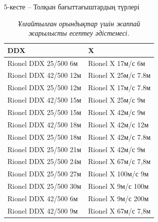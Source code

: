 \begin{table}[H]
\caption*{5-кесте -- Толқын бағыттағыштардың түрлері}
\centering
\begin{tabular}{|l|l|}
\hline
DDX & X \\ \hline
Rionel DDX 25/500 6м & Rionel X 17м/с 6м \\ \hline
Rionel DDX 42/500 12м & Rionel X 25м/с 7.8м \\ \hline
Rionel DDX 25/500 12м & Rionel X 17м/с 7.8м \\ \hline
Rionel DDX 42/500 15м & Rionel X 25м/с 9м \\ \hline
Rionel DDX 25/500 15м & Rionel X 42м/с 9м \\ \hline
Rionel DDX 42/500 18м & Rionel X 42м/с 12м \\ \hline
Rionel DDX 25/500 18м & Rionel X 42м/с 7.8м \\ \hline
Rionel DDX 25/500 21м & Rionel X 42м/с 9м \\ \hline
Rionel DDX 25/500 24м & Rionel X 67м/с 7,8м \\ \hline
Rionel DDX 25/500 27м & Rionel X 100м/с 9м \\ \hline
Rionel DDX 25/500 30м & Rionel X 9м/с 100м \\ \hline
Rionel DDX 42/500 6м & Rionel X 9м/с 200м \\ \hline
Rionel DDX 42/500 9м & Rionel X 67м/с 7,8м \\ \hline
\end{tabular}
\caption*{\emph{Ұлғайтылған орындықтар үшін жаппай жарылысты есептеу әдістемесі.}}
\end{table}


